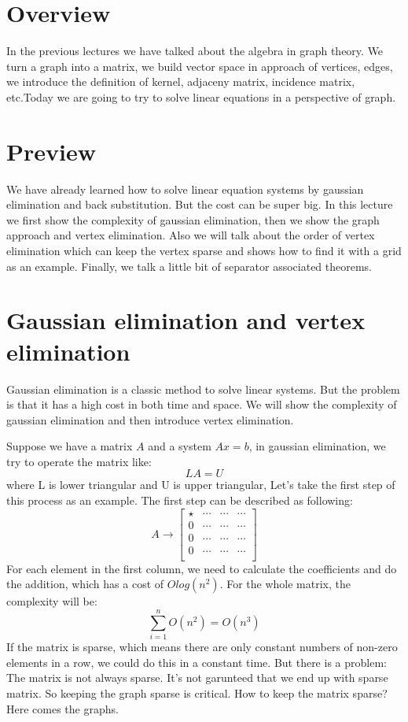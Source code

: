 \documentclass{article}
\begin{document}
    
    \section{Overview}
    In the previous lectures we have talked about the algebra in graph theory. We turn a graph into a matrix, we build vector space in approach of vertices, edges, we introduce the definition of kernel, adjaceny matrix, incidence matrix, etc.Today we are going to try to solve linear equations in a perspective of graph.
    
    \section{Preview}
    We have already learned how to solve linear equation systems by gaussian elimination and back substitution. But the cost can be super big. In this lecture we first show the complexity of gaussian elimination, then we show the graph approach and vertex elimination. Also we will talk about the order of vertex elimination which can keep the vertex sparse and shows how to find it with a grid as an example. Finally, we talk a little bit of separator associated theorems.
    
    
    \section{Gaussian elimination and vertex elimination}
    Gaussian elimination is a classic method to solve linear systems. But the problem is that it has a high cost in both time and space. We will show the complexity of gaussian elimination and then introduce vertex elimination.
    
    Suppose we have a matrix $A$ and a system $Ax=b$, in gaussian elimination, we try to operate the matrix like:
    \[
    LA = U
    \]
    where L is lower triangular and U is upper triangular, Let's take the first step of this process as an example.
    The first step can be described as following:
    $$ A \longrightarrow \begin{bmatrix}
    \star & \cdots & \cdots & \cdots \\
    0 & \cdots & \cdots & \cdots \\
    0 & \cdots & \cdots & \cdots \\
    0 & \cdots & \cdots & \cdots \\
    \end{bmatrix} $$\newline
    For each element in the first column, we need to calculate the coefficients and do the addition, which has a  cost of $Olog(n^2)$. For the whole matrix, the complexity will be:
    \[
    \sum_{i=1}^nO(n^2) = O(n^3)
    \]
    If the matrix is sparse, which means there are only constant numbers of non-zero elements in a row, we could do this in a constant time. But there is a problem: The matrix is not always sparse. It's not garunteed that we end up with sparse matrix. So keeping the graph sparse is critical. How to keep the matrix sparse? Here comes the graphs.
    
\end{document}
